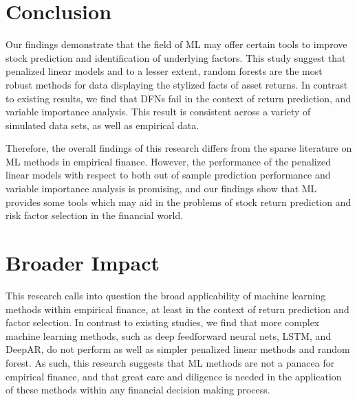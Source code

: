 \documentclass{article}
\begin{document}
 

\section{Conclusion}

Our findings demonstrate that the field of ML may offer certain tools to improve stock prediction and identification of underlying factors. This study suggest that penalized linear models and to a lesser extent, random forests are the most robust methods for data displaying the stylized facts of asset returns. In contrast to existing results, we find that DFNs fail in the context of return prediction, and variable importance analysis. This result is consistent across a variety of simulated data sets, as well as empirical data. 


Therefore, the overall findings of this research differs from the sparse literature on ML methods in empirical finance. However, the performance of the penalized linear models with respect to both out of sample prediction performance and variable importance analysis is promising, and our findings show that ML provides some tools which may aid in the problems of stock return prediction and risk factor selection in the financial world. 

\section*{Broader Impact}
This research calls into question the broad applicability of machine learning methods within empirical finance, at least in the context of return prediction and factor selection. In contrast to existing studies, we find that more complex machine learning methods, such as deep feedforward neural nets, LSTM, and DeepAR, do not perform as well as simpler penalized linear methods and random forest. As such, this research suggests that ML methods are not a panacea for empirical finance, and that great care and diligence is needed in the application of these methods within any financial decision making process. 
\end{document}
